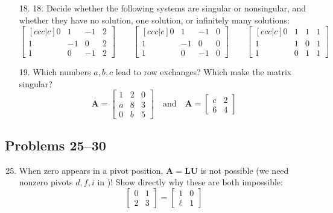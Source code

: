 \begin{itemize}
\begin{itemize}
      \item[18.] 18. Decide whether the following systems are singular or
        nonsingular, and whether they have no solution, one solution, or
        infinitely many solutions:
        \[%
        \begin{bmatrix}[ccc|c]
        0 & 1 & -1 & 2 \\
        1 & -1 & 0 & 2 \\
        1 & 0 & -1 & 2
        \end{bmatrix} \qquad
        \begin{bmatrix}[ccc|c]
        0 & 1 & -1 & 0 \\
        1 & -1 & 0 & 0 \\
        1 & 0 & -1 & 0
        \end{bmatrix} \qquad
        \begin{bmatrix}[ccc|c]
        0 & 1 & 1 & 1 \\
        1 & 1 & 0 & 1 \\
        1 & 0 & 1 & 1
        \end{bmatrix}
        \]%

      \item[19.] Which numbers \(a, b, c\) lead to row exchanges? Which make the
        matrix singular?
        \[%
        \bm{A} = \begin{bmatrix}
        1 & 2 & 0  \\
        a & 8 & 3 \\
        0 & b & 5
        \end{bmatrix}\quad\text{and}\quad
        \bm{A} = \begin{bmatrix}
        c & 2 \\
        6 & 4
        \end{bmatrix}
        \]%

    \end{itemize}

    \subsection{Problems 25--30}
    \begin{enumerate}\setcounter{enumi}{24}\color{foreground-2}
      \item When zero appears in a pivot position, \(\bm{A} = \bm{LU}\) is not
        possible (we need nonzero pivots \( d,f,i \) in )! Show directly
        why these are both impossible:
        \[%
        \begin{bmatrix}
        0 & 1  \\
        2 & 3
        \end{bmatrix} =
        \begin{bmatrix}
        1 & 0 \\
        \ell & 1
        \end{bmatrix}
        \]%


\end{enumerate}
\end{itemize}

